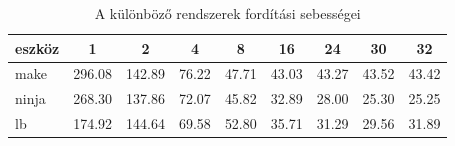 \begin{table}[htb]
	\begin{tabularx}{\linewidth}{|X||c|c|c|c|c|c|c|c|}
		\hline
		eszköz & 1 & 2 & 4 & 8 & 16 & 24 & 30 & 32 \\
		\hline
		\hline
		make & 296.08 & 142.89 & 76.22 & 47.71 & 43.03 & 43.27 & 43.52 & 43.42 \\
		\hline
		
		ninja & 268.30 & 137.86 & 72.07 & 45.82 & 32.89 & 28.00 & 25.30 & 25.25 \\
		\hline
		
		lb & 174.92 & 144.64 & 69.58 & 52.80 & 35.71 & 31.29 & 29.56 & 31.89 \\
		\hline
	\end{tabularx}
	\caption{A különböző rendszerek fordítási sebességei}
	\label{tbl:bs-speed}
\end{table}



